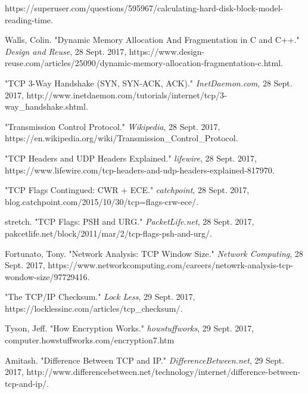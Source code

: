 \documentclass[a4paper]{article}
\begin{document}
\begin{thebibliography}{9}
	https://superuser.com/questions/595967/calculating-hard-disk-block-model-reading-time.
    
	Walls, Colin. "Dynamic Memory Allocation And Fragmentation in C and C++." \emph{Design and Reuse}, 28 Sept. 2017,
    https://www.design-reuse.com/articles/25090/dynamic-memory-allocation-fragmentation-c.html.
    
	"TCP 3-Way Handshake (SYN, SYN-ACK, ACK)." \emph{InetDaemon.com}, 28 Sept. 2017, 
    http://www.inetdaemon.com/tutorials/internet/tcp/3-way\_handshake.shtml.
    
	"Transmission Control Protocol." \emph{Wikipedia}, 28 Sept. 2017,
    https://en.wikipedia.org/wiki/Transmission\_Control\_Protocol.

	"TCP Headers and UDP Headers Explained." \emph{lifewire}, 28 Sept. 2017,
    https://www.lifewire.com/tcp-headers-and-udp-headers-explained-817970.

	"TCP Flags Contingued: CWR + ECE." \emph{catchpoint}, 28 Sept. 2017,
    blog.catchpoint.com/2015/10/30/tcp=flags-crw-ece/.
    
	stretch. "TCP Flags: PSH and URG." \emph{PacketLife.net}, 28 Sept. 2017,
    pakcetlife.net/block/2011/mar/2/tcp-flags-psh-and-urg/.
    
	Fortunato, Tony. "Network Analysis: TCP Window Size." \emph{Network Computing}, 28 Sept. 2017,
    https://www.networkcomputing.com/careers/netowrk-analysis-tcp-wondow-size/97729416.
    
	"The TCP/IP Checksum." \emph{Lock Less}, 29 Sept. 2017,
    https://locklessinc.com/articles/tcp\_checksum/.
    
	Tyson, Jeff. "How Encryption Works." \emph{howstuffworks}, 29 Sept. 2017,
    computer.howstuffworks.com/encryption7.htm
    
	Amitash. "Difference Between TCP and IP." \emph{DifferenceBetween.net}, 29 Sept. 2017,
    http://www.differencebetween.net/technology/internet/difference-between-tcp-and-ip/.

\end{thebibliography}
\end{document}
